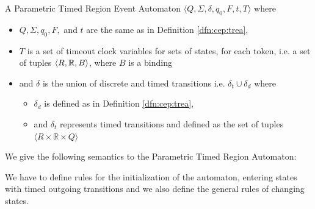 				
				\begin{dfn}
					\label{dfn:cep:ptrea}
					A Parametric Timed Region Event Automaton $\langle Q,\Sigma,\delta,q_0, F, t, T \rangle$ where
					\begin{itemize}
						\item $Q, \Sigma, q_0, F,$ and  $t$ are the same as in Definition \ref{dfn:cep:trea},
						\item $T$ is a set of timeout clock variables for sets of states, for each token, i.e. a set of tuples $\langle R, \mathbb{R}, B \rangle$, where $B$ is a binding
						\item and $\delta$ is the union of discrete and timed transitions i.e. $\delta_t \cup \delta_d$ where
						\begin{itemize}
							\item $\delta_d$ is defined as in Definition \ref{dfn:cep:trea},
							\item and $\delta_t$ represents timed transitions and defined as the set of tuples $\langle R \times \mathbb{R} \times Q \rangle$ 
						\end{itemize}
					\end{itemize}
				\end{dfn}
				
				We give the following semantics to the Parametric Timed Region Automaton:
				
				We have to define rules for the initialization of the automaton,
				entering states with timed outgoing transitions 
				and we also define the general rules of changing states. 
				
